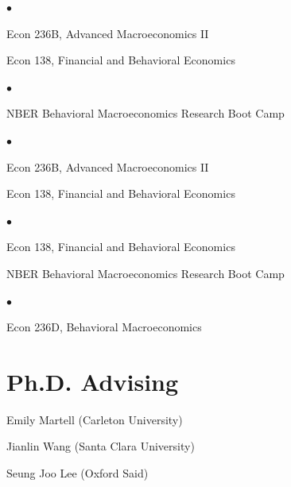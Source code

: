 \documentclass[line]{res}
\newenvironment{list1}{
  \begin{list}{\ding{113}}{%
      \setlength{\itemsep}{0.07in}
      \setlength{\parsep}{0in} \setlength{\parskip}{0in}
		\setlength{\topsep}{0.07in} \setlength{\partopsep}{0in}
      \setlength{\leftmargin}{0.0in}}}{\end{list}}
\newenvironment{list2}{
  \begin{list}{$\bullet$}{%
      \setlength{\itemsep}{0in}
      \setlength{\parsep}{0in} \setlength{\parskip}{0in}
      \setlength{\topsep}{0in} \setlength{\partopsep}{0in} 
      \setlength{\leftmargin}{0in}}}{\end{list}}
\begin{document}
\begin{resume}
\begin{list1}
\item[2025]  
\begin{list2}
\item[] Econ 236B, Advanced Macroeconomics II
\vspace{0.2cm}
\item[] Econ 138, Financial and Behavioral Economics
\end{list2}

\item[2024]  
\begin{list2}
\item[] NBER Behavioral Macroeconomics Research Boot Camp
\end{list2}

\item[2023]  
\begin{list2}
\item[] Econ 236B, Advanced Macroeconomics II
\vspace{0.2cm}
\item[] Econ 138, Financial and Behavioral Economics
\end{list2}

\item[2022]  
\begin{list2}
\item[] Econ 138, Financial and Behavioral Economics
\vspace{0.2cm}
\item[] NBER Behavioral Macroeconomics Research Boot Camp
\end{list2}

\item[2021]  
\begin{list2}
\item[] Econ 236D, Behavioral Macroeconomics
\end{list2}

\end{list1}

\section{\sc Ph.D. Advising}
\begin{list1}
\item[2026] Emily Martell (Carleton University)

\item[2023] Jianlin Wang (Santa Clara University)

\item[2022] Seung Joo Lee (Oxford Said)


\end{list1}
\end{resume}
\end{document}
